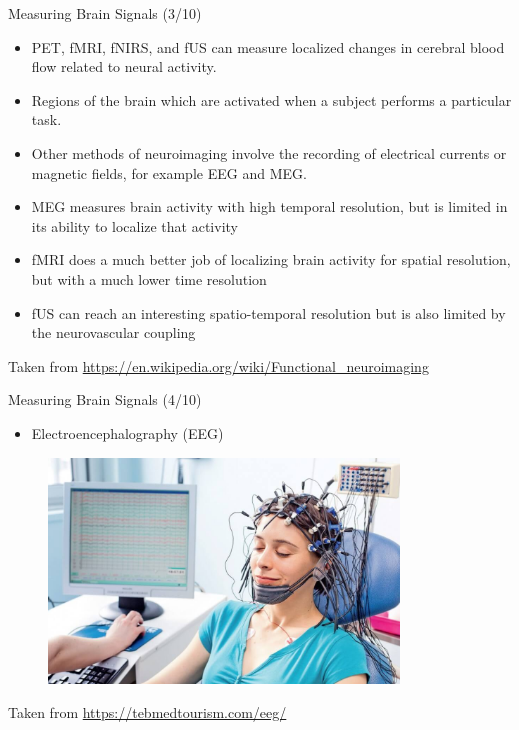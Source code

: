 \documentclass{beamer}
\begin{document}
\begin{frame}
{\centerline{Measuring Brain Signals (3/10)}}
\begin{itemize}
    \item  PET, fMRI, fNIRS, and fUS can measure localized changes in cerebral blood flow related to neural activity.
    \item Regions of the brain which are activated when a subject performs a particular task.
    \item Other methods of neuroimaging involve the recording of electrical currents or magnetic fields, for example EEG and MEG.
    \item MEG measures brain activity with high temporal resolution, but is limited in its ability to localize that activity
    \item fMRI does a much better job of localizing brain activity for spatial resolution, but with a much lower time resolution
    \item fUS can reach an interesting spatio-temporal resolution but is also limited by the neurovascular coupling
\end{itemize}
    \begin{center}
    \tiny{Taken from \url{https://en.wikipedia.org/wiki/Functional_neuroimaging}}
    \end{center}
\end{frame}

\begin{frame}
{\centerline{Measuring Brain Signals (4/10)}}
\begin{itemize}
    \item Electroencephalography (EEG)
\end{itemize}
\begin{figure}
    \centering
    \includegraphics[height=6cm]{P2023.AIBCCSS.BrainSignals/EEG.jpg}
\end{figure}
\begin{center}
    \tiny{Taken from \url{https://tebmedtourism.com/eeg/}}
\end{center}    
\end{frame}
\end{document}
